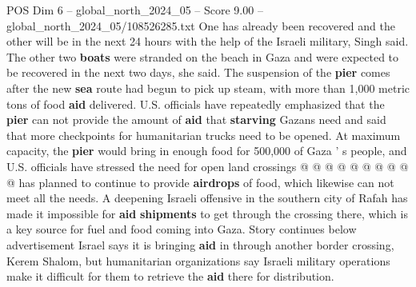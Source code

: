 \begin{textsample}{POS Dim 6 – global\_north\_2024\_05 – Score 9.00 – global\_north\_2024\_05/108526285.txt}
One has already been recovered and the other will be in the next 24 hours with the help of the Israeli military, Singh said.
The other two \textbf{boats} were stranded on the beach in Gaza and were expected to be recovered in the next two days, she said.
The suspension of the \textbf{pier} comes after the new \textbf{sea} route had begun to pick up steam, with more than 1,000 metric tons of food \textbf{aid} delivered.
U.S. officials have repeatedly emphasized that the \textbf{pier} can not provide the amount of \textbf{aid} that \textbf{starving} Gazans need and said that more checkpoints for humanitarian trucks need to be opened.
At maximum capacity, the \textbf{pier} would bring in enough food for 500,000 of Gaza ' s people, and U.S. officials have stressed the need for open land crossings @ @ @ @ @ @ @ @ @ @ has planned to continue to provide \textbf{airdrops} of food, which likewise can not meet all the needs.
A deepening Israeli offensive in the southern city of Rafah has made it impossible for \textbf{aid} \textbf{shipments} to get through the crossing there, which is a key source for fuel and food coming into Gaza.
Story continues below advertisement Israel says it is bringing \textbf{aid} in through another border crossing, Kerem Shalom, but humanitarian organizations say Israeli military operations make it difficult for them to retrieve the \textbf{aid} there for distribution.

\end{textsample}
